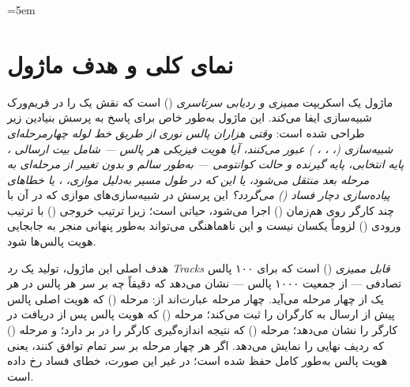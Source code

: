\sloppy
\emergencystretch=5em



\section{نمای کلی و هدف ماژول}

ماژول  یک اسکریپت \emph{ممیزی و ردیابی سرتاسری} () است که نقش یک  را در فریم‌ورک شبیه‌سازی  ایفا می‌کند. این ماژول به‌طور خاص برای پاسخ به پرسش بنیادین زیر طراحی شده است: \emph{وقتی هزاران پالس نوری از طریق خط لوله چهارمرحله‌ای شبیه‌سازی (، ، ، ) عبور می‌کنند، آیا هویت فیزیکی هر پالس — شامل بیت ارسالی ، پایه انتخابی، پایه گیرنده  و حالت کوانتومی — به‌طور سالم و بدون تغییر از مرحله‌ای به مرحله بعد منتقل می‌شود، یا این که در طول مسیر به‌دلیل  موازی، ، یا خطاهای پیاده‌سازی دچار فساد () می‌گردد؟} این پرسش در شبیه‌سازی‌های موازی که در آن  با چند کارگر روی هم‌زمان () اجرا می‌شود، حیاتی است؛ زیرا ترتیب خروجی () با ترتیب ورودی () لزوماً یکسان نیست و این ناهماهنگی می‌تواند به‌طور پنهانی منجر به جابجایی هویت پالس‌ها شود.

هدف اصلی این ماژول، تولید یک \emph{رد Tracks قابل ممیزی} () است که برای ۱۰۰ پالس تصادفی — از جمعیت ۱۰۰۰ پالس — نشان می‌دهد که دقیقاً چه بر سر هر پالس در هر یک از چهار مرحله می‌آید. چهار مرحله عبارت‌اند از: مرحله  () که هویت اصلی پالس پیش از ارسال به کارگران را ثبت می‌کند؛ مرحله  () که هویت پالس پس از دریافت در کارگر را نشان می‌دهد؛ مرحله  () که نتیجه اندازه‌گیری کارگر را در بر دارد؛ و مرحله  () که ردیف نهایی  را نمایش می‌دهد. اگر هر چهار مرحله بر سر تمام  توافق کنند، یعنی هویت پالس به‌طور کامل حفظ شده است؛ در غیر این صورت، خطای فساد رخ داده است.

